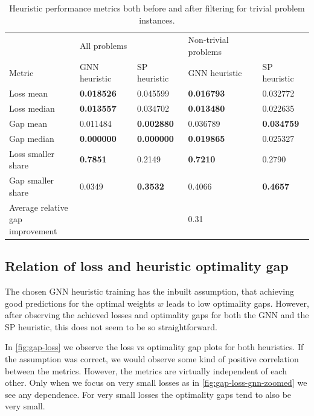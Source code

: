 \documentclass[english, 12pt, a4paper, sci, utf8, a-2b, online]{aaltothesis}
\begin{document}
\begin{table}[]
    \centering
    \caption{Heuristic performance metrics both before and after filtering for trivial problem instances.}
    \label{tab:results}
    \footnotesize
    \begin{tabular}{l|ll|ll}
                                     & All problems  &                   & Non-trivial problems &                   \\
    Metric                           & GNN heuristic & SP heuristic & GNN heuristic        & SP heuristic \\ \hline
    Loss mean                        & \textbf{0.018526} & 0.045599          & \textbf{0.016793}    & 0.032772          \\
    Loss median                      & \textbf{0.013557} & 0.034702          & \textbf{0.013480}    & 0.022635          \\
    Gap mean                         & 0.011484          & \textbf{0.002880} & 0.036789             & \textbf{0.034759} \\
    Gap median                       & \textbf{0.000000} & \textbf{0.000000} & \textbf{0.019865}    & 0.025327          \\
    Loss smaller share               & \textbf{0.7851}   & 0.2149            & \textbf{0.7210}      & 0.2790            \\
    Gap smaller share                & 0.0349            & \textbf{0.3532}   & 0.4066               & \textbf{0.4657}   \\
    \makecell{Average relative\\gap improvement} &               &                   & 0.31                 &                  
    \end{tabular}
    \end{table}


\subsection{Relation of loss and heuristic optimality gap}
\label{sec:loss-gap-relation}

The chosen GNN heuristic training has the inbuilt assumption, that achieving good predictions for the optimal weights $w$ leads to low optimality gaps. However, after observing the achieved losses and optimality gaps for both the GNN and the SP heuristic, this does not seem to be so straightforward.

In \cref{fig:gap-loss} we observe the loss vs optimality gap plots for both heuristics. If the assumption was correct, we would observe some kind of positive correlation between the metrics. However, the metrics are virtually independent of each other. Only when we focus on very small losses as in \cref{fig:gap-loss-gnn-zoomed} we see any dependence. For very small losses the optimality gaps tend to also be very small.
\end{document}
